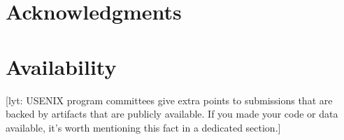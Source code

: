 \documentclass[letterpaper,twocolumn,10pt]{article}
\newcommand\lyt[1]{\textcolor{green!55!blue}{[lyt: {#1}]}}
\begin{document}







\section*{Acknowledgments}

\section*{Availability}

\lyt{USENIX program committees give extra points to submissions that are
backed by artifacts that are publicly available. If you made your code
or data available, it's worth mentioning this fact in a dedicated
section.}




\end{document}
